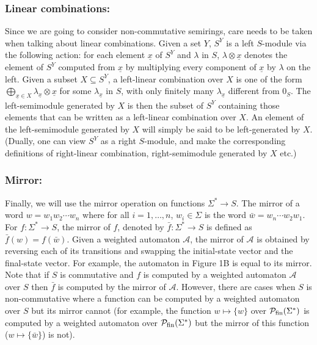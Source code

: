 \documentclass[10pt,a4paper]{amsart}
\theoremstyle{definition}
\numberwithin{equation}{section}
\numberwithin{theorem}{section}
\begin{document}
\subsubsection*{\textbf{Linear combinations:}} Since we are going to consider non-commutative semirings, care needs to be taken when talking about linear combinations. Given a set $Y$, $S^Y$ is a left $S$-module via the following action: for each element $\underline{x}$ of $S^Y$ and $\lambda$ in $S$, $\lambda \otimes \underline{x}$ denotes the element of $S^Y$ computed from $\underline{x}$ by multiplying every component of $\underline{x}$ by $\lambda$ on the left. Given a subset $X \subseteq S^Y$, a left-linear combination over $X$ is one of the form $\bigoplus_{\underline{x} \in X} \lambda_{\underline{x}}\otimes \underline{x}$ for some $\lambda_{\underline{x}}$ in $S$, with only finitely many $\lambda_{\underline{x}}$ different from $0_S$. The left-semimodule generated by $X$ is then the subset of $S^Y$ containing those elements that can be written as a left-linear combination over $X$. An element of the left-semimodule generated by $X$ will simply be said to be left-generated by $X$. (Dually, one can view $S^Y$ as a right $S$-module, and make the corresponding definitions of right-linear combination, right-semimodule generated by $X$ etc.)

\subsubsection*{\textbf{Mirror:}} Finally, we will use the mirror operation on functions $\Sigma^* \to S$. The mirror of a word $w = w_1 w_2\cdots w_n$ where for all $i=1,\ldots, n$, $w_i \in \Sigma$ is the word $\bar{w} = w_n \cdots w_2 w_1$. For $f:\Sigma^* \to S$, the mirror of $f$, denoted by $\bar{f}:\Sigma^* \to S$ is defined as $\bar{f}(w) = f(\bar{w})$. Given a weighted automaton $\mathcal{A}$, the mirror of $\mathcal{A}$ is obtained by reversing each of its transitions and swapping the initial-state vector and the final-state vector. For example, the automaton in Figure 1B is equal to its mirror. Note that if $S$ is commutative and $f$ is computed by a weighted automaton $\mathcal{A}$ over $S$ then $\bar{f}$ is computed by the mirror of $\mathcal{A}$. However, there are cases when $S$ is non-commutative where a function can be computed by a weighted automaton over $S$ but its mirror cannot (for example, the function $w \mapsto \{w\}$ over $\mathcal{P}_{\rm fin}(\Sigma^*)$ is computed by a weighted automaton over $\mathcal{P}_{\rm fin}(\Sigma^*)$ but the mirror of this function ($w \mapsto \{\bar{w}\}$) is not).
\end{document}
